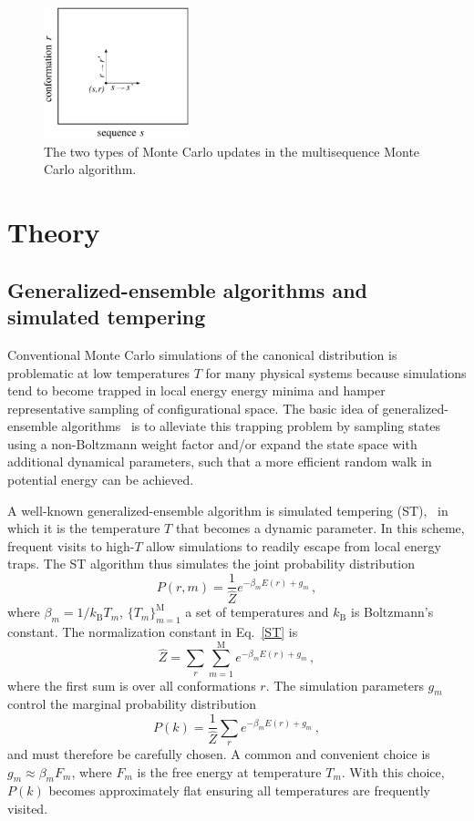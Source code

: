 \documentclass[%
 aip,
rsi,%
 amsmath,amssymb,
 reprint,%
]{revtex4-1}
\newcommand	 {\rbar}	{{r}}
\begin{document}
\begin{figure}
\includegraphics[width=4.2cm]{Fig1}
\caption{The two types of Monte Carlo updates in the multisequence Monte Carlo algorithm.}
\end{figure}

\section{Theory}

\subsection{Generalized-ensemble algorithms and simulated tempering}
\noindent
Conventional Monte Carlo simulations of the canonical distribution is problematic at low temperatures $T$ for many physical systems because simulations tend to become trapped in local energy energy minima and hamper representative sampling of configurational space. The basic idea of generalized-ensemble algorithms~\cite{Mitsutake2001} is to alleviate this trapping problem by sampling states using a non-Boltzmann weight factor and/or expand the state space with additional dynamical parameters, such that a more efficient random walk in potential energy can be achieved. 

A well-known generalized-ensemble algorithm is simulated tempering (ST),~\cite{Marinari1992,Lyubartsev1992} in which it is the temperature $T$ that becomes a dynamic parameter. In this scheme, frequent visits to high-$T$ allow simulations to readily escape from local energy traps. The ST algorithm thus simulates the joint probability distribution 
\begin{equation}
P(\rbar,m) =\dfrac{1}{\hat{Z}} e^{-\beta_m E(\rbar) + g_m}\,,
\label{ST}
\end{equation}
where  $\beta_m=1/k_\mathrm{B} T_m$, $\{T_m\}_{m=1}^\mathrm{M}$ a set of temperatures and $k_\mathrm{B}$ is Boltzmann's constant. The normalization constant in Eq.~\ref{ST} is  
\begin{equation}
\hat{Z} = \sum_r \sum_{m=1}^{\mathrm{M}}e^{-\beta_m E(\rbar) + g_m}\,,
\end{equation}
where the first sum is over all conformations $\rbar$. The simulation parameters $g_m$ control the marginal probability distribution
\begin{equation}
P(k) = \frac{1}{\hat{Z}}\sum_r e^{-\beta_m E(\rbar) + g_m} \,,
\end{equation}
and must therefore be carefully chosen. A common and convenient choice is $g_m\approx \beta_m F_m$, where $F_m$ is the free energy at temperature $T_m$. With this choice, $P(k)$ becomes approximately flat ensuring all temperatures are frequently visited. 
\end{document}
